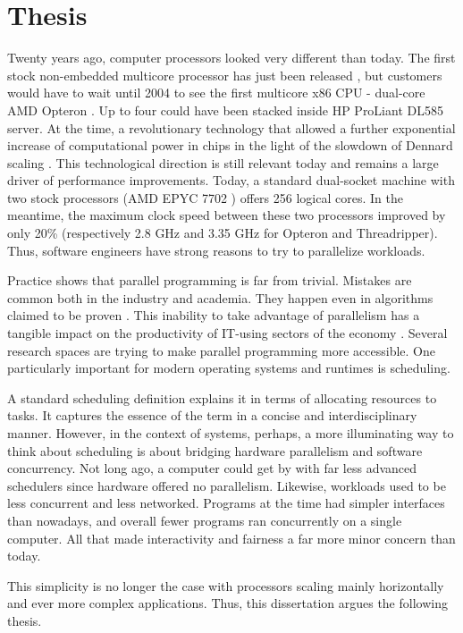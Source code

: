 \documentclass[12pt,a4paper,twoside]{report}
\begin{document}
\section{Thesis}
\label{section:thesis}
Twenty years ago, computer processors looked very different than today. The first stock non-embedded multicore processor has just been released \cite{POWER4Wi47:online} , but customers would have to wait until 2004 to see the first multicore x86 CPU - dual-core AMD Opteron \cite{AMDAnnou13:online}. Up to four could have been stacked inside HP ProLiant DL585 server. At the time, a revolutionary technology that allowed a further exponential increase of computational power in chips \cite{mooremulti} in the light of the slowdown of Dennard scaling \cite{Bohr2007}. This technological direction is still relevant today and remains a large driver of performance improvements. Today, a standard dual-socket machine with two stock processors (AMD EPYC 7702 \cite{2ndGenAM1:online}) offers 256 logical cores. In the meantime, the maximum clock speed between these two processors improved by only 20\% (respectively 2.8 GHz and 3.35 GHz for Opteron and Threadripper). Thus, software engineers have strong reasons to try to parallelize workloads. 

Practice shows that parallel programming is far from trivial. Mistakes are common both in the industry and academia. They happen even in algorithms claimed to be proven \cite{Norris2013}. This inability to take advantage of parallelism has a tangible impact on the productivity of IT-using sectors of the economy \cite{Khan2018}. Several research spaces are trying to make parallel programming more accessible. One particularly important for modern operating systems and runtimes is scheduling. 

A standard scheduling definition explains it in terms of allocating resources to tasks. It captures the essence of the term in a concise and interdisciplinary manner. However, in the context of systems, perhaps, a more illuminating way to think about scheduling is about bridging hardware parallelism and software concurrency. Not long ago, a computer could get by with far less advanced schedulers since hardware offered no parallelism. Likewise, workloads used to be less concurrent and less networked. Programs at the time had simpler interfaces than nowadays, and overall fewer programs ran concurrently on a single computer. All that made interactivity and fairness a far more minor concern than today. 

This simplicity is no longer the case with processors scaling mainly horizontally and ever more complex applications. Thus, this dissertation argues the following thesis. 
\end{document}
